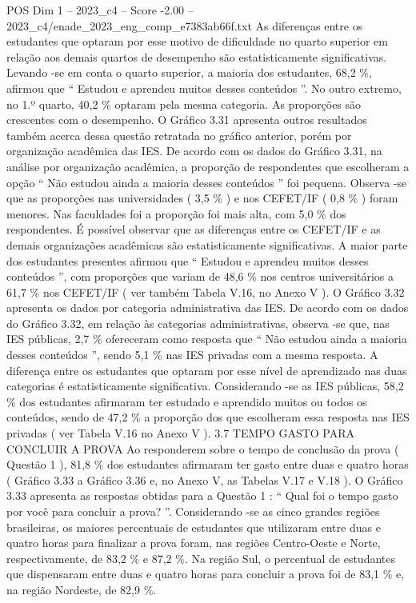 \begin{textsample}{POS Dim 1 – 2023\_c4 – Score -2.00 – 2023\_c4/enade\_2023\_eng\_comp\_e7383ab66f.txt}
As diferenças entre os estudantes que optaram por esse motivo de dificuldade no quarto superior em relação aos demais quartos de desempenho são estatisticamente significativas.
Levando -se em conta o quarto superior, a maioria dos estudantes, 68,2 \%, afirmou que “ Estudou e aprendeu muitos desses conteúdos ”.
No outro extremo, no 1.º quarto, 40,2 \% optaram pela mesma categoria.
As proporções são crescentes com o desempenho.
O Gráfico 3.31 apresenta outros resultados também acerca dessa questão retratada no gráfico anterior, porém por organização acadêmica das IES.
De acordo com os dados do Gráfico 3.31, na análise por organização acadêmica, a proporção de respondentes que escolheram a opção “ Não estudou ainda a maioria desses conteúdos ” foi pequena.
Observa -se que as proporções nas universidades ( 3,5 \% ) e nos CEFET/IF ( 0,8 \% ) foram menores.
Nas faculdades foi a proporção foi mais alta, com 5,0 \% dos respondentes.
É possível observar que as diferenças entre os CEFET/IF e as demais organizações acadêmicas são estatisticamente significativas.
A maior parte dos estudantes presentes afirmou que “ Estudou e aprendeu muitos desses conteúdos ”, com proporções que variam de 48,6 \% nos centros universitários a 61,7 \% nos CEFET/IF ( ver também Tabela V.16, no Anexo V ).
O Gráfico 3.32 apresenta os dados por categoria administrativa das IES.
De acordo com os dados do Gráfico 3.32, em relação às categorias administrativas, observa -se que, nas IES públicas, 2,7 \% ofereceram como resposta que “ Não estudou ainda a maioria desses conteúdos ”, sendo 5,1 \% nas IES privadas com a mesma resposta.
A diferença entre os estudantes que optaram por esse nível de aprendizado nas duas categorias é estatisticamente significativa.
Considerando -se as IES públicas, 58,2 \% dos estudantes afirmaram ter estudado e aprendido muitos ou todos os conteúdos, sendo de 47,2 \% a proporção dos que escolheram essa resposta nas IES privadas ( ver Tabela V.16 no Anexo V ). 3.7 TEMPO GASTO PARA CONCLUIR A PROVA Ao responderem sobre o tempo de conclusão da prova ( Questão 1 ), 81,8 \% dos estudantes afirmaram ter gasto entre duas e quatro horas ( Gráfico 3.33 a Gráfico 3.36 e, no Anexo V, as Tabelas V.17 e V.18 ).
O Gráfico 3.33 apresenta as respostas obtidas para a Questão 1 : “ Qual foi o tempo gasto por você para concluir a prova? ”.
Considerando -se as cinco grandes regiões brasileiras, os maiores percentuais de estudantes que utilizaram entre duas e quatro horas para finalizar a prova foram, nas regiões Centro-Oeste e Norte, respectivamente, de 83,2 \% e 87,2 \%.
Na região Sul, o percentual de estudantes que dispensaram entre duas e quatro horas para concluir a prova foi de 83,1 \% e, na região Nordeste, de 82,9 \%.

\end{textsample}
